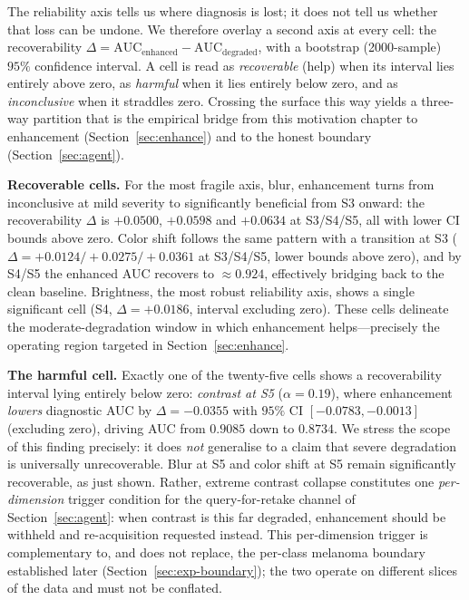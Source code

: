 The reliability axis tells us where diagnosis is lost; it does not tell us whether that loss can be undone. We therefore overlay a second axis at every cell: the recoverability $\Delta = \mathrm{AUC}_{\mathrm{enhanced}} - \mathrm{AUC}_{\mathrm{degraded}}$, with a bootstrap (2000-sample) $95\%$ confidence interval. A cell is read as \emph{recoverable} (help) when its interval lies entirely above zero, as \emph{harmful} when it lies entirely below zero, and as \emph{inconclusive} when it straddles zero. Crossing the surface this way yields a three-way partition that is the empirical bridge from this motivation chapter to enhancement (Section~\ref{sec:enhance}) and to the honest boundary (Section~\ref{sec:agent}).

\textbf{Recoverable cells.} For the most fragile axis, blur, enhancement turns from inconclusive at mild severity to significantly beneficial from S3 onward: the recoverability $\Delta$ is $+0.0500$, $+0.0598$ and $+0.0634$ at S3/S4/S5, all with lower CI bounds above zero. Color shift follows the same pattern with a transition at S3 ($\Delta = +0.0124 / +0.0275 / +0.0361$ at S3/S4/S5, lower bounds above zero), and by S4/S5 the enhanced AUC recovers to $\approx0.924$, effectively bridging back to the clean baseline. Brightness, the most robust reliability axis, shows a single significant cell (S4, $\Delta = +0.0186$, interval excluding zero). These cells delineate the moderate-degradation window in which enhancement helps---precisely the operating region targeted in Section~\ref{sec:enhance}.

\textbf{The harmful cell.} Exactly one of the twenty-five cells shows a recoverability interval lying entirely below zero: \emph{contrast at S5} ($\alpha=0.19$), where enhancement \emph{lowers} diagnostic AUC by $\Delta = -0.0355$ with $95\%$ CI $[-0.0783, -0.0013]$ (excluding zero), driving AUC from $0.9085$ down to $0.8734$. We stress the scope of this finding precisely: it does \emph{not} generalise to a claim that severe degradation is universally unrecoverable. Blur at S5 and color shift at S5 remain significantly recoverable, as just shown. Rather, extreme contrast collapse constitutes one \emph{per-dimension} trigger condition for the query-for-retake channel of Section~\ref{sec:agent}: when contrast is this far degraded, enhancement should be withheld and re-acquisition requested instead. This per-dimension trigger is complementary to, and does not replace, the per-class melanoma boundary established later (Section~\ref{sec:exp-boundary}); the two operate on different slices of the data and must not be conflated.


